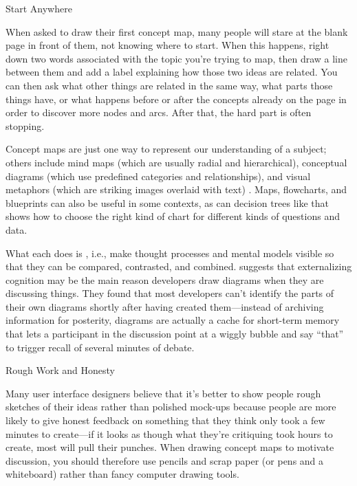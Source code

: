 \begin{callout}{Start Anywhere}

  When asked to draw their first concept map, many people will stare
  at the blank page in front of them, not knowing where to start.
  When this happens, right down two words associated with the topic
  you're trying to map, then draw a line between them and add a label
  explaining how those two ideas are related.  You can then ask what
  other things are related in the same way, what parts those things
  have, or what happens before or after the concepts already on the
  page in order to discover more nodes and arcs.  After that, the hard
  part is often stopping.

\end{callout}

Concept maps are just one way to represent our understanding of a
subject; others include mind maps (which are usually radial and
hierarchical), conceptual diagrams (which use predefined categories
and relationships), and visual metaphors (which are striking images
overlaid with text) \cite{Eppl2006}.  Maps, flowcharts, and blueprints
can also be useful in some contexts, as can decision trees like
\cite{Abel2009} that shows how to choose the right kind of chart for
different kinds of questions and data.

What each does is , i.e., make thought processes and mental models visible
so that they can be compared, contrasted, and combined.
\cite{Cher2007} suggests that externalizing cognition may be the main
reason developers draw diagrams when they are discussing things.  They
found that most developers can't identify the parts of their own
diagrams shortly after having created them---instead of archiving
information for posterity, diagrams are actually a cache for
short-term memory that lets a participant in the discussion point at a
wiggly bubble and say ``that'' to trigger recall of several minutes of
debate.

\begin{callout}{Rough Work and Honesty}

  Many user interface designers believe that it's better to show
  people rough sketches of their ideas rather than polished mock-ups
  because people are more likely to give honest feedback on something
  that they think only took a few minutes to create---if it looks as
  though what they're critiquing took hours to create, most will pull
  their punches.  When drawing concept maps to motivate discussion,
  you should therefore use pencils and scrap paper (or pens and a
  whiteboard) rather than fancy computer drawing tools.

\end{callout}

